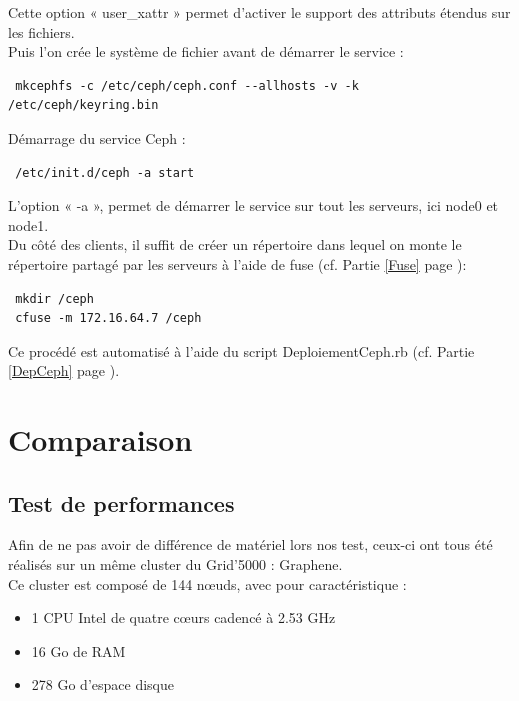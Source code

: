 \documentclass[12pt]{report}
\begin{document}
                        Cette option « user\_xattr » permet d'activer le support des attributs étendus sur les fichiers.\\
                        Puis l'on crée le système de fichier avant de démarrer le service :
                        \begin{lstlisting}
 mkcephfs -c /etc/ceph/ceph.conf --allhosts -v -k /etc/ceph/keyring.bin
                        \end{lstlisting}
                        Démarrage du service Ceph :
                        \begin{lstlisting}
 /etc/init.d/ceph -a start
                        \end{lstlisting}
                        L'option « -a », permet de démarrer le service sur tout les serveurs, ici node0 et node1.\\
                        
                        Du côté des clients, il suffit de créer un répertoire dans lequel on monte le répertoire partagé par les serveurs à l'aide de fuse (cf. Partie \ref{Fuse} page \pageref{Fuse}):
                        \begin{lstlisting}
 mkdir /ceph
 cfuse -m 172.16.64.7 /ceph
                        \end{lstlisting}
                        Ce procédé est automatisé à l'aide du script DeploiementCeph.rb (cf. Partie \ref{DepCeph} page \pageref{DepCeph}).
	\chapter{Comparaison}
		\section{Test de performances}
			Afin de ne pas avoir de différence de matériel lors nos test, ceux-ci ont tous été réalisés sur un même cluster du Grid'5000 : Graphene.\\

			Ce cluster est composé de 144 nœuds, avec pour caractéristique :
			\begin{itemize}
				\item 1 CPU Intel de quatre cœurs cadencé à 2.53 GHz
				\item 16 Go de RAM
				\item 278 Go d'espace disque\\
			\end{itemize}
\end{document}
